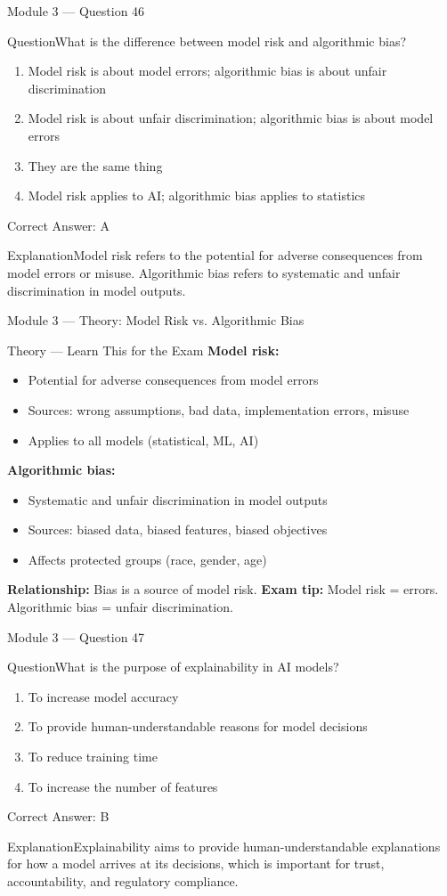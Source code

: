 \documentclass[aspectratio=169,10pt]{beamer}
\newcommand{\question}[1]{\begin{block}{Question}#1\end{block}}
\newcommand{\options}[4]{%
	\begin{enumerate}[label=\Alph*.,leftmargin=*]
		\item #1
		\item #2
		\item #3
		\item #4
	\end{enumerate}
}
\newcommand{\answerbox}[1]{\begin{exampleblock}{Correct Answer: #1}\end{exampleblock}}
\newcommand{\explain}[1]{\begin{block}{Explanation}#1\end{block}}
\newcommand{\theory}[1]{%
	\begin{block}{Theory --- Learn This for the Exam}
		\small #1
	\end{block}
}
\begin{document}
	\begin{frame}{Module 3 --- Question 46}
		\question{What is the difference between model risk and algorithmic bias?}
		\options{Model risk is about model errors; algorithmic bias is about unfair discrimination}{Model risk is about unfair discrimination; algorithmic bias is about model errors}{They are the same thing}{Model risk applies to AI; algorithmic bias applies to statistics}
		\answerbox{A}
		\explain{Model risk refers to the potential for adverse consequences from model errors or misuse. Algorithmic bias refers to systematic and unfair discrimination in model outputs.}
	\end{frame}
	
	\begin{frame}{Module 3 --- Theory: Model Risk vs. Algorithmic Bias}
		\theory{
			\textbf{Model risk:}
			\begin{itemize}
				\item Potential for adverse consequences from model errors
				\item Sources: wrong assumptions, bad data, implementation errors, misuse
				\item Applies to all models (statistical, ML, AI)
			\end{itemize}
			\textbf{Algorithmic bias:}
			\begin{itemize}
				\item Systematic and unfair discrimination in model outputs
				\item Sources: biased data, biased features, biased objectives
				\item Affects protected groups (race, gender, age)
			\end{itemize}
			\textbf{Relationship:} Bias is a source of model risk.
			\textbf{Exam tip:} Model risk = errors. Algorithmic bias = unfair discrimination.
		}
	\end{frame}
	
	\begin{frame}{Module 3 --- Question 47}
		\question{What is the purpose of explainability in AI models?}
		\options{To increase model accuracy}{To provide human-understandable reasons for model decisions}{To reduce training time}{To increase the number of features}
		\answerbox{B}
		\explain{Explainability aims to provide human-understandable explanations for how a model arrives at its decisions, which is important for trust, accountability, and regulatory compliance.}
	\end{frame}
	
\end{document}
